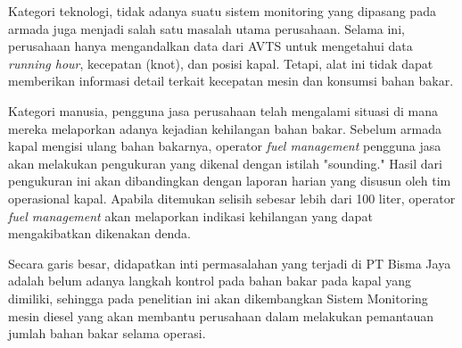 Kategori teknologi, tidak adanya suatu sistem monitoring yang dipasang pada armada juga menjadi salah satu masalah utama perusahaan. Selama ini, perusahaan hanya mengandalkan data dari AVTS untuk mengetahui data \textit{running hour}, kecepatan (knot), dan posisi kapal. Tetapi, alat ini tidak dapat memberikan informasi detail terkait kecepatan mesin dan konsumsi bahan bakar.

Kategori manusia, pengguna jasa perusahaan telah mengalami situasi di mana mereka melaporkan adanya kejadian kehilangan bahan bakar. Sebelum armada kapal mengisi ulang bahan bakarnya, operator \textit{fuel management} pengguna jasa akan melakukan pengukuran yang dikenal dengan istilah "sounding." Hasil dari pengukuran ini akan dibandingkan dengan laporan harian yang disusun oleh tim operasional kapal. Apabila ditemukan selisih sebesar lebih dari 100 liter, operator \textit{fuel management} akan melaporkan indikasi kehilangan yang dapat mengakibatkan dikenakan denda.

Secara garis besar, didapatkan inti permasalahan yang terjadi di PT Bisma Jaya adalah belum adanya langkah kontrol pada bahan bakar pada kapal yang dimiliki, sehingga pada penelitian ini akan dikembangkan Sistem Monitoring mesin diesel yang akan membantu perusahaan dalam melakukan pemantauan jumlah bahan bakar selama operasi.